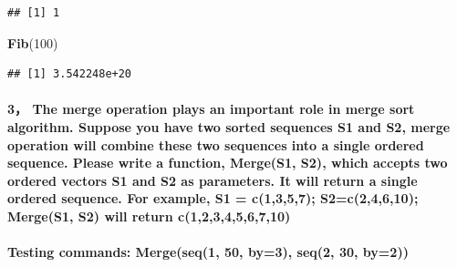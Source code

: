 \documentclass[]{article}
\newenvironment{Shaded}{\begin{snugshade}}{\end{snugshade}}
\newcommand{\KeywordTok}[1]{\textcolor[rgb]{0.13,0.29,0.53}{\textbf{#1}}}
\newcommand{\DecValTok}[1]{\textcolor[rgb]{0.00,0.00,0.81}{#1}}
\newcommand{\NormalTok}[1]{#1}
\let\oldparagraph\paragraph
\renewcommand{\paragraph}[1]{\oldparagraph{#1}\mbox{}}
\begin{document}
\begin{verbatim}
## [1] 1
\end{verbatim}

\begin{Shaded}
\begin{Highlighting}[]
\KeywordTok{Fib}\NormalTok{(}\DecValTok{100}\NormalTok{)}
\end{Highlighting}
\end{Shaded}

\begin{verbatim}
## [1] 3.542248e+20
\end{verbatim}

\paragraph{3， The merge operation plays an important role in merge sort
algorithm. Suppose you have two sorted sequences S1 and S2, merge
operation will combine these two sequences into a single ordered
sequence. Please write a function, Merge(S1, S2), which accepts two
ordered vectors S1 and S2 as parameters. It will return a single ordered
sequence. For example, S1 = c(1,3,5,7); S2=c(2,4,6,10); Merge(S1, S2)
will return
c(1,2,3,4,5,6,7,10)}\label{the-merge-operation-plays-an-important-role-in-merge-sort-algorithm.-suppose-you-have-two-sorted-sequences-s1-and-s2-merge-operation-will-combine-these-two-sequences-into-a-single-ordered-sequence.-please-write-a-function-merges1-s2-which-accepts-two-ordered-vectors-s1-and-s2-as-parameters.-it-will-return-a-single-ordered-sequence.-for-example-s1-c1357-s2c24610-merges1-s2-will-return-c123456710}

\paragraph{Testing commands: Merge(seq(1, 50, by=3), seq(2, 30,
by=2))}\label{testing-commands-mergeseq1-50-by3-seq2-30-by2}
\end{document}
